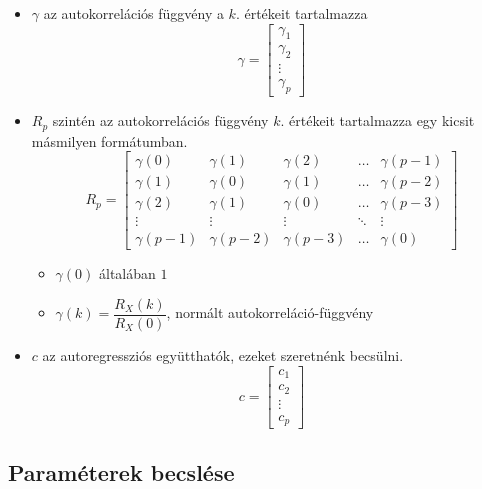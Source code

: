 \documentclass[11pt,a4paper]{article}
\begin{document}
						\begin{itemize}
						\item $\gamma$ az autokorrelációs függvény a $k.$ értékeit tartalmazza
							$$\gamma = \left[ \begin{array}{c}
							\gamma_1 \\ \gamma_2 \\ \vdots \\ \gamma_p
							\end{array}\right]$$
						\item $R_p$ szintén az autokorrelációs függvény $k.$ értékeit tartalmazza egy kicsit másmilyen formátumban.
							$$R_p = \left[\begin{array}{cccccc}
							\gamma(0) & \gamma(1) & \gamma(2) & \dots & \gamma(p-1) \\
							\gamma(1) & \gamma(0) & \gamma(1) & \dots & \gamma(p-2) \\
							\gamma(2) & \gamma(1) & \gamma(0) & \dots & \gamma(p-3) \\
							\vdots & \vdots & \vdots & \ddots & \vdots \\
							\gamma(p-1) & \gamma(p-2) & \gamma(p-3) & \dots & \gamma(0)
							\end{array}\right]$$
						\begin{itemize}
							\item $\gamma(0)$ általában $1$
							\item $\gamma(k) = \dfrac{R_X(k)}{R_X(0)}$, normált autokorreláció-függvény
						\end{itemize}
						\item $c$ az autoregressziós együtthatók, ezeket szeretnénk becsülni.
							$$c = \left[\begin{array}{c}
							c_1 \\ c_2 \\ \vdots \\ c_p
							\end{array}\right]$$
						\end{itemize}
				\subsection{Paraméterek becslése}
\end{document}
